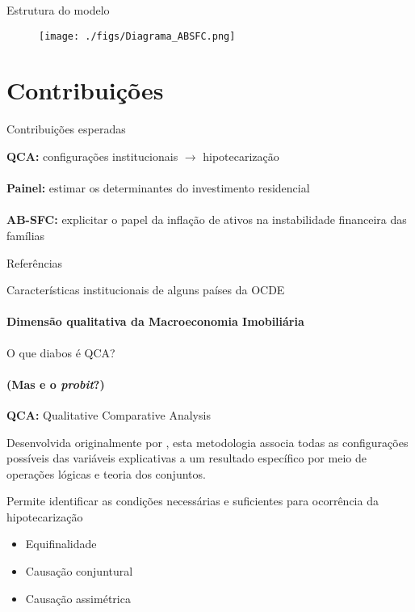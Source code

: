 \documentclass[11pt]{beamer}
\newcommand{\backupbegin}{
   \newcounter{framenumberappendix}
   \setcounter{framenumberappendix}{\value{framenumber}}
}
\newcommand{\backupend}{
   \addtocounter{framenumberappendix}{-\value{framenumber}}
   \addtocounter{framenumber}{\value{framenumberappendix}}
}
\begin{document}
\begin{frame}{Estrutura do modelo}

\begin{figure}
    \centering
    \texttt{[image: ./figs/Diagrama\_ABSFC.png]}
\end{figure}

\end{frame}


\section{Contribuições}

\begin{frame}{Contribuições esperadas}

\textbf{QCA:} configurações institucionais $\to$ hipotecarização
\\~\\
\textbf{Painel:} estimar os determinantes do investimento residencial
\\~\\
\textbf{AB-SFC:} explicitar o papel da inflação de ativos na instabilidade financeira das famílias

\end{frame}

\begin{frame}[allowframebreaks]{Referências}
\printbibliography
\end{frame}



\appendix
\backupbegin

\begin{frame}{Características institucionais de alguns países da OCDE}
\framesubtitle{Dimensão qualitativa da Macroeconomia Imobiliária}
    
\end{frame}

\begin{frame}{O que diabos é QCA?}
\framesubtitle{(Mas e o \textit{probit}?)}

\textbf{QCA:} Qualitative Comparative Analysis

 Desenvolvida originalmente por \textcite{ragin_comparative_1989}, esta metodologia associa todas as configurações possíveis das variáveis explicativas a um resultado específico por meio de operações lógicas e teoria dos conjuntos.

Permite identificar as condições necessárias e suficientes para ocorrência da hipotecarização

\begin{itemize}
    \item Equifinalidade
    \item Causação conjuntural
    \item Causação assimétrica
\end{itemize}
\end{frame}
\backupend
\end{document}
